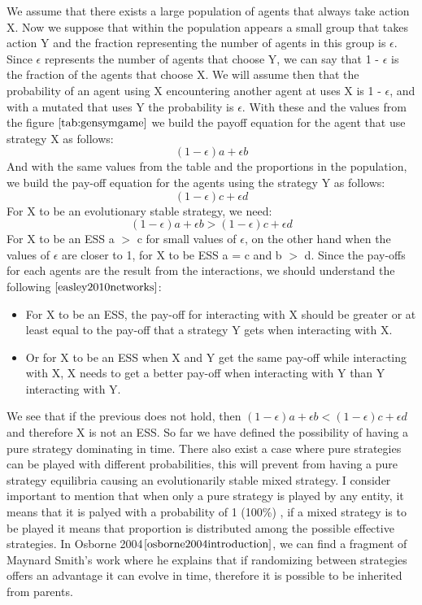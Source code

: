 We assume that there exists a large population of agents that always take action X. Now we suppose that within the population appears a small group that takes action Y and the   fraction representing the number of agents in this group is $\epsilon$.  Since $\epsilon$ represents the number of agents that choose Y, we can say that 1 - $\epsilon$ is the fraction of the agents that choose X.  We will assume then that the probability of an agent using X encountering another agent at uses X is 1 - $\epsilon$, and with a mutated that uses Y the probability is $\epsilon$.  With these and the values from the figure $\ref{tab:gensymgame}$  we build the payoff equation for the agent that use strategy X as follows:
\begin{equation}
(1-{\epsilon})a + {\epsilon}b
\end{equation}
And with the same values from the table and the proportions in the population, we build the pay-off equation for the agents using the strategy Y as follows:
\begin{equation}
(1-{\epsilon})c + {\epsilon}d
\end{equation}
For X to be an evolutionary stable strategy, we need:
\begin{equation}
(1-{\epsilon})a + {\epsilon}b > (1-{\epsilon})c + {\epsilon}d
\end{equation}
For X to be an ESS a $>$ c for small values of $\epsilon$, on the other hand when the values of $\epsilon$ are closer to 1, for X to be ESS a = c and b $>$ d.
Since the pay-offs for each agents are the result from the interactions, we should understand the following  $\cite{easley2010networks}$:
\begin{itemize}
\item For X to be an ESS, the pay-off for interacting with X should be greater or at least equal to the pay-off that a strategy Y gets when interacting with X.
\item Or for X to be an ESS when X and Y get the same pay-off while interacting with X, X needs to get a better pay-off when interacting with Y than Y interacting with Y.
\end{itemize}
We see that if the previous does not hold, then $(1-{\epsilon})a + {\epsilon}b < (1-{\epsilon})c + {\epsilon}d$ and therefore X is not an ESS.
So far we have defined the possibility of having a pure strategy dominating in time. There also exist a case where pure strategies can be played with different probabilities, this will prevent from having a pure strategy equilibria causing an evolutionarily stable mixed strategy. I consider important to mention that when only a pure strategy is played by any entity, it means that it is palyed with a probability of 1 (100\%) , if a mixed strategy is to be played it means that proportion is distributed among the possible effective strategies. In Osborne 2004$\cite{osborne2004introduction}$, we can find a fragment of Maynard Smith's work where he explains that  if randomizing between strategies offers an advantage it can evolve in time, therefore it is possible to be inherited from parents. 

